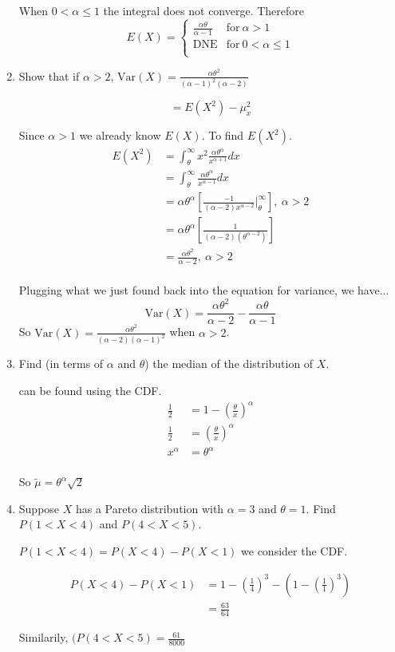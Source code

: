 \documentclass{tufte-book}
\newcommand{\Var}{\mathrm{Var}}
\theoremstyle{mytheoremstyle}
\theoremstyle{mylemstyle}
\theoremstyle{mydefstyle}
\begin{document}
\begin{enumerate}
When $0 <\alpha \leq 1$ the integral does not converge.  Therefore
\[ E(X)=
\begin{cases}
    \frac{\alpha\theta}{\alpha-1}  & \text{for}\ \alpha > 1\\
    \text{DNE} & \text{for}\ 0<\alpha \leq1\\
\end{cases}
\]

\item Show that if $\alpha >2$, $\Var(X) = \frac{\alpha\theta^2}{(\alpha-1)^2(\alpha-2)}$


\[  = E(X^2)-\mu_x^2 \]

Since $\alpha>1$ we already know $E(X)$.  To find $E(X^2)$.
\begin{align*}
E(X^2) &= \int_\theta^\infty x^2 \frac{\alpha\theta^{\alpha}}{x^{\alpha+1}}dx\\
&=\int_\theta^\infty \frac{\alpha\theta^{\alpha}}{x^{\alpha-1}}dx\\
&= \alpha\theta^{\alpha}[\frac{-1}{(\alpha-2)x^{\alpha-2}}\Big|_\theta^\infty] ,\ \alpha > 2\\
&=\alpha\theta^{\alpha}[\frac{1}{(\alpha-2)(\theta^{\alpha-2})}]\\
&= \frac{\alpha\theta^2}{\alpha-2} ,\ \alpha >2\\
\end{align*}

Plugging what we just found back into the equation for variance, we have...
\[ \Var(X) = \frac{\alpha\theta^2}{\alpha-2} - \frac{\alpha\theta}{\alpha-1}  \]
So $\Var(X) = \frac{\alpha\theta^2}{(\alpha-2)(\alpha-1)^2}$ when $\alpha >2$.

\item Find (in terms of $\alpha$ and $\theta$) the median of the distribution of $X$.

 can be found using the CDF.
\begin{align*}
\frac{1}{2} &= 1-(\frac{\theta}{x})^\alpha\\
\frac{1}{2}&=(\frac{\theta}{x})^\alpha\\
x^\alpha &= \theta^\alpha\\
\end{align*}

So $\tilde{\mu} = \theta^\alpha\sqrt{2}$

\item Suppose $X$ has a Pareto distribution with $\alpha=3$ and $\theta=1$.  Find $P(1<X<4)$ and $P(4<X<5)$.

 $P(1<X<4) = P(X<4)-P(X<1)$ we consider the CDF.

\begin{align*}
P(X<4)-P(X<1) &= 1-(\frac{1}{4})^3 - (1-(\frac{1}{1})^3)\\
&=  \frac{63}{64}
\end{align*}

Similarily, $(P(4<X<5)=\frac{61}{8000}$
\end{enumerate}
\end{document}

